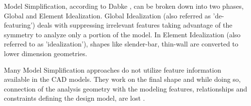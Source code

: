 \vspace{-.6cm}

	Model Simplification, according to Dabke \citep{Dabke1994}, can be broken down into two phases, Global and Element Idealization. Global Idealization (also referred as 'de-featuring') deals with suppressing irrelevant features taking advantage of the symmetry to analyze only a portion of the model. In Element Idealization (also referred to as 'idealization'), shapes like slender-bar, thin-wall are converted to lower dimension geometries.

	Many Model Simplification  approaches do not utilize feature information available in the CAD models. They work on the final shape and while doing so, connection of the analysis geometry with the modeling features, relationships and constraints defining the design model, are lost \citep{Smit2011}.
